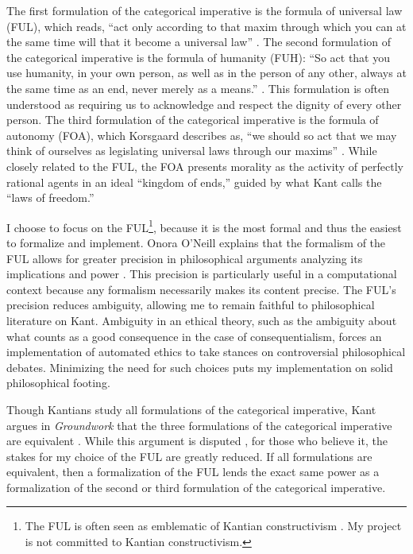 \begin{isabellebody}
\begin{isamarkuptext}
The first formulation of the categorical imperative is the
formula of universal law (FUL), which reads, ``act only according to that maxim through which you can 
at the same time will that it become a universal law'' \citep[34]{groundwork}. The 
second formulation of the categorical imperative is the formula of humanity (FUH): ``So act that you use humanity, 
in your own person, as well as in the person of any other, always at the same time as an end, never merely 
as a means.'' \cite[41]{groundwork}. This formulation is often understood as requiring us to 
acknowledge and respect the dignity of every other person. The third formulation of the categorical 
imperative is the formula of autonomy (FOA), which Korsgaard describes
as, ``we should so act that we may think of ourselves as legislating universal laws through our 
maxims'' \cite[28]{korsgaardintro}. While closely related to the FUL, the FOA presents morality as the activity of 
perfectly rational agents in an ideal ``kingdom of ends,'' guided by what Kant calls the ``laws of freedom.''

I choose to focus on the FUL\footnote{The FUL is often seen as emblematic of Kantian constructivism \cite[173]{ebelsduggan}. 
My project is not committed to Kantian constructivism.}, because it is the most formal and thus the 
easiest to formalize and implement. Onora O'Neill explains that the formalism of the FUL allows 
for greater precision in philosophical arguments analyzing its implications and power \cite[33]{actingonprinciple}. This precision 
is particularly useful in a computational context because any formalism necessarily makes its content 
precise. The FUL's precision reduces ambiguity, allowing me to remain faithful to philosophical
literature on Kant. Ambiguity in an ethical theory, such as the ambiguity about what counts as a good consequence
in the case of consequentialism, forces an implementation of automated ethics to take stances on controversial
philosophical debates. Minimizing the need for such choices puts my implementation on solid philosophical footing.

Though Kantians study all formulations of the categorical imperative, Kant argues in \emph{Groundwork} 
that the three formulations of the categorical imperative are equivalent \citep{groundwork}. While this 
argument is disputed \citep{sepkant}, for those who believe it, the
stakes for my choice of the FUL are greatly reduced. If all formulations are equivalent, then a formalization of the FUL
lends the exact same power as a formalization of the second or third formulation of the categorical 
imperative. 


\end{isamarkuptext}
\end{isabellebody}
